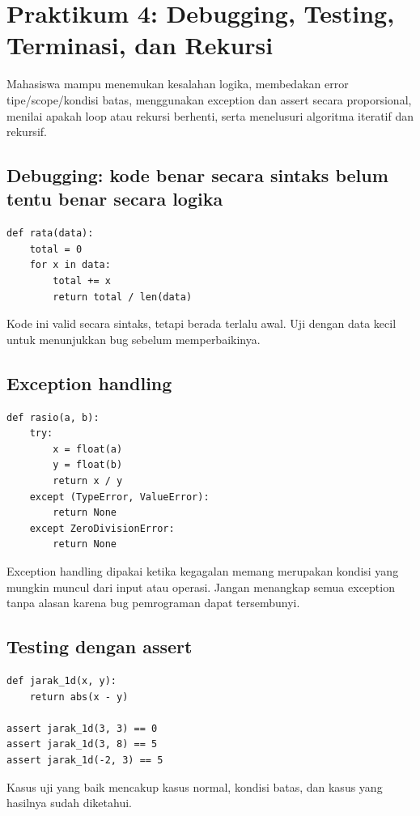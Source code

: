 \documentclass[11pt,a4paper]{report}
\newcommand{\kode}[1]{\texttt{\detokenize{#1}}}
\begin{document}
\chapter{Praktikum 4: Debugging, Testing, Terminasi, dan Rekursi}
\begin{tujuanbox}
Mahasiswa mampu menemukan kesalahan logika, membedakan error tipe/scope/kondisi batas, menggunakan exception dan assert secara proporsional, menilai apakah loop atau rekursi berhenti, serta menelusuri algoritma iteratif dan rekursif.
\end{tujuanbox}

\section{Debugging: kode benar secara sintaks belum tentu benar secara logika}
\begin{lstlisting}
def rata(data):
    total = 0
    for x in data:
        total += x
        return total / len(data)
\end{lstlisting}
Kode ini valid secara sintaks, tetapi \kode{return} berada terlalu awal. Uji dengan data kecil untuk menunjukkan bug sebelum memperbaikinya.

\section{Exception handling}
\begin{lstlisting}
def rasio(a, b):
    try:
        x = float(a)
        y = float(b)
        return x / y
    except (TypeError, ValueError):
        return None
    except ZeroDivisionError:
        return None
\end{lstlisting}
Exception handling dipakai ketika kegagalan memang merupakan kondisi yang mungkin muncul dari input atau operasi. Jangan menangkap semua exception tanpa alasan karena bug pemrograman dapat tersembunyi.

\section{Testing dengan assert}
\begin{lstlisting}
def jarak_1d(x, y):
    return abs(x - y)

assert jarak_1d(3, 3) == 0
assert jarak_1d(3, 8) == 5
assert jarak_1d(-2, 3) == 5
\end{lstlisting}
Kasus uji yang baik mencakup kasus normal, kondisi batas, dan kasus yang hasilnya sudah diketahui.
\end{document}
